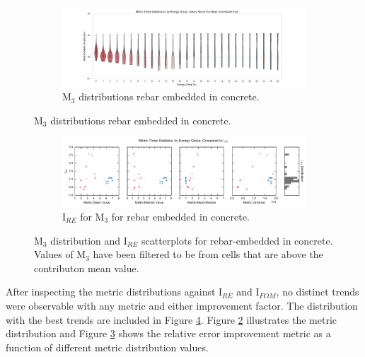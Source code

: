 \begin{figure}[htb!]
  \centering
  \begin{subfigure}[t]{\textwidth}
    \includegraphics[width=\linewidth]{./chapters/characterization_probs/figures/char/prob_4/metric_three_violin_mean.pdf}
    \caption{M$_3$ distributions rebar embedded in concrete.}
    \label{fig:M3violinrebar}
  \end{subfigure}
\end{figure}
\begin{figure}[htb!]\ContinuedFloat
  \centering
  \begin{subfigure}[t]{\textwidth}
    \includegraphics[width=\linewidth]{./chapters/characterization_probs/figures/char/prob_4/metric_three_err_stats_mean.pdf}
    \caption{I$_{RE}$ for M$_3$ for rebar embedded in concrete.}
    \label{fig:M3statsrebar}
  \end{subfigure}
  \caption[M$_3$ distribution and trends for rebar-embedded concrete
  problem.]{M$_3$ distribution and I$_{RE}$ scatterplots for rebar-embedded in
concrete. Values of M$_3$ have been filtered to be from cells that are above the
contributon mean value.}
  \label{fig:rebarplots}
\end{figure}

After inspecting the metric distributions against I$_{RE}$ and I$_{FOM}$, no
distinct trends were observable with any metric and either improvement factor.
The distribution with the best trends are included in Figure
\ref{fig:rebarplots}. Figure \ref{fig:M3violinrebar} illustrates the
metric distribution and Figure \ref{fig:M3statsrebar} shows the relative error
improvement metric as a function of different metric distribution values.

